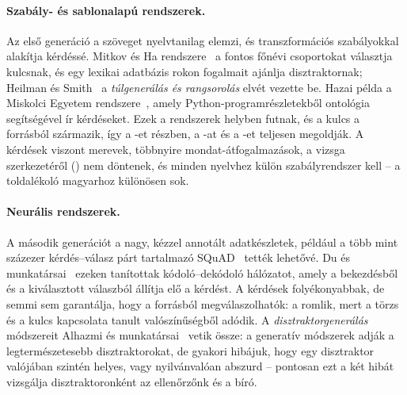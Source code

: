 \paragraph{Szabály- és sablonalapú rendszerek.} Az első generáció a szöveget nyelvtanilag elemzi, és
transzformációs szabályokkal alakítja kérdéssé. Mitkov és Ha rendszere~\cite{mitkov2003computer} a fontos
főnévi csoportokat választja kulcsnak, és egy lexikai adatbázis rokon fogalmait ajánlja disztraktornak;
Heilman és Smith~\cite{heilman2010good} a \emph{túlgenerálás és rangsorolás} elvét vezette be. Hazai
példa a Miskolci Egyetem rendszere~\cite{alshboul2024hybrid}, amely Python-programrészletekből ontológia
segítségével ír kérdéseket. Ezek a rendszerek helyben futnak, és a kulcs a forrásból származik, így a
-et részben, a -at és a -et teljesen megoldják. A kérdések viszont merevek, többnyire
mondat-átfogalmazások, a vizsga szerkezetéről () nem döntenek, és minden nyelvhez külön
szabályrendszer kell -- a toldalékoló magyarhoz különösen sok.

\paragraph{Neurális rendszerek.} A második generációt a nagy, kézzel annotált adatkészletek, például a
több mint százezer kérdés--válasz párt tartalmazó SQuAD~\cite{rajpurkar2016squad} tették lehetővé. Du és
munkatársai~\cite{du2017learning} ezeken tanítottak kódoló--dekódoló hálózatot, amely a bekezdésből és a
kiválasztott válaszból állítja elő a kérdést. A kérdések folyékonyabbak, de semmi sem garantálja, hogy a
forrásból megválaszolhatók: a  romlik, mert a törzs és a kulcs kapcsolata tanult valószínűségből adódik.
A \emph{disztraktorgenerálás} módszereit Alhazmi és munkatársai~\cite{alhazmi2024distractor} vetik össze:
a generatív módszerek adják a legtermészetesebb disztraktorokat, de gyakori hibájuk, hogy egy disztraktor
valójában szintén helyes, vagy nyilvánvalóan abszurd -- pontosan ezt a két hibát vizsgálja disztraktoronként
az ellenőrzőnk és a bíró.

